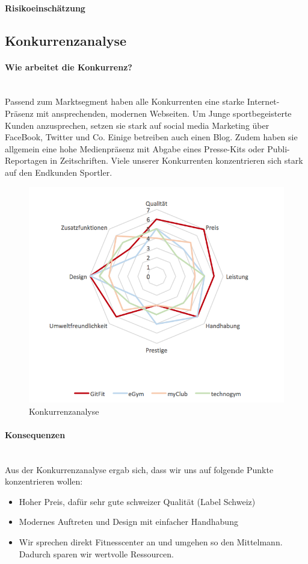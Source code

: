\paragraph{Risikoeinschätzung} \qquad {}
\subsection{Konkurrenzanalyse}
\paragraph{Wie arbeitet die Konkurrenz?} \hfill \\
Passend zum Marktsegment haben alle Konkurrenten eine starke Internet-Präsenz mit ansprechenden, modernen Webseiten. 
Um Junge sportbegeisterte Kunden anzusprechen, setzen sie stark auf social media Marketing über FaceBook, Twitter und Co. Einige betreiben auch einen Blog. Zudem haben sie allgemein eine hohe Medienpräsenz mit Abgabe eines Presse-Kits oder Publi-Reportagen in Zeitschriften. Viele unserer Konkurrenten konzentrieren sich stark auf den Endkunden Sportler.

\begin{figure}[H]
\centering
\includegraphics[width=0.9\linewidth]{images/konkurrenz}
\caption{Konkurrenzanalyse}
\label{fig:konkurrenz}
\end{figure}
\paragraph{Konsequenzen}\hfill \\
Aus der Konkurrenzanalyse ergab sich, dass wir uns auf folgende Punkte konzentrieren wollen:
\begin{itemize}
	\item Hoher Preis, dafür sehr gute schweizer Qualität (Label Schweiz)
	\item Modernes Auftreten und Design mit einfacher Handhabung
	\item Wir sprechen direkt Fitnesscenter an und umgehen so den Mittelmann. Dadurch sparen wir wertvolle Ressourcen.
\end{itemize}

